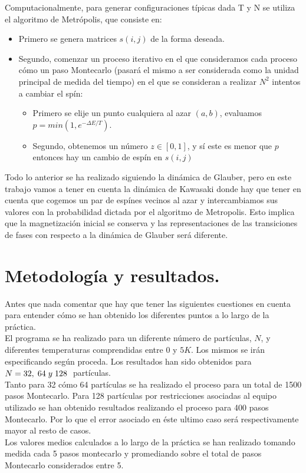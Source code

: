 \documentclass[12pt,paper]{article}
\begin{document}
Computacionalmente, para generar configuraciones típicas dada T y N se utiliza el algoritmo de Metrópolis, que consiste en:
\begin{itemize}
    \item Primero se genera matrices $s(i,j)$ de la forma deseada.
    \item Segundo, comenzar un proceso iterativo en el que consideramos cada proceso cómo un paso Montecarlo (pasará el mismo a ser considerada como la unidad principal de medida del tiempo) en el que se consideran a realizar $N^2$ intentos a cambiar el spín:
    \begin{itemize}
        \item Primero se elije un punto cualquiera al azar $(a,b)$, evaluamos $p=min(1,e^{- \Delta E/T})$.
        \item Segundo, obtenemos un número $z \in [0,1]$, y sí este es menor que $p$ entonces hay un cambio de espín en $s(i,j)$
    \end{itemize}
\end{itemize}

Todo lo anterior se ha realizado siguiendo la dinámica de Glauber, pero en este trabajo vamos a tener en cuenta la dinámica de Kawasaki donde hay que tener en cuenta que cogemos un par de espínes vecinos al azar y intercambiamos sus valores con la probabilidad dictada por el algoritmo de Metropolis. Esto implica que la magnetización inicial se conserva y las representaciones de las transiciones de fases con respecto a la dinámica de Glauber será diferente.

\section{Metodología y resultados.}
Antes que nada comentar que hay que tener las siguientes cuestiones en cuenta para entender cómo se han obtenido los diferentes puntos a lo largo de la práctica.\\

El programa se ha realizado para un diferente número de partículas, $N$, y diferentes temperaturas comprendidas entre $0$ y $5 K$. Los mismos se irán especificando según proceda. Los resultados han sido obtenidos para $N = 32, \hspace{1mm} 64 \hspace{1mm} y \hspace{1mm} 128 \hspace{1mm}$ partículas.\\
Tanto para 32 cómo 64 partículas se ha realizado el proceso para un total de 1500 pasos Montecarlo. Para 128 partículas por restricciones asociadas al equipo utilizado se han obtenido resultados realizando el proceso para 400 pasos Montecarlo. Por lo que el error asociado en éste ultimo caso será respectivamente mayor al resto de casos.\\
Los valores medios calculados a lo largo de la práctica se han realizado tomando medida cada 5 pasos montecarlo y promediando sobre el total de pasos Montecarlo considerados entre 5.\\
\end{document}
